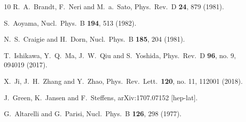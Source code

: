 \begin{thebibliography}{10}
  R.~A.~Brandt, F.~Neri and M.~a.~Sato,
  Phys.\ Rev.\ D {\bf 24}, 879 (1981).


  S.~Aoyama,
  Nucl.\ Phys.\ B {\bf 194}, 513 (1982).


  N.~S.~Craigie and H.~Dorn,
  Nucl.\ Phys.\ B {\bf 185}, 204 (1981).


  T.~Ishikawa, Y.~Q.~Ma, J.~W.~Qiu and S.~Yoshida,
  Phys.\ Rev.\ D {\bf 96}, no. 9, 094019 (2017).


  X.~Ji, J.~H.~Zhang and Y.~Zhao,
  Phys.\ Rev.\ Lett.\  {\bf 120}, no. 11, 112001 (2018).


  J.~Green, K.~Jansen and F.~Steffens,
  arXiv:1707.07152 [hep-lat].


  G.~Altarelli and G.~Parisi,
  Nucl.\ Phys.\ B {\bf 126}, 298 (1977).



\end{thebibliography}
